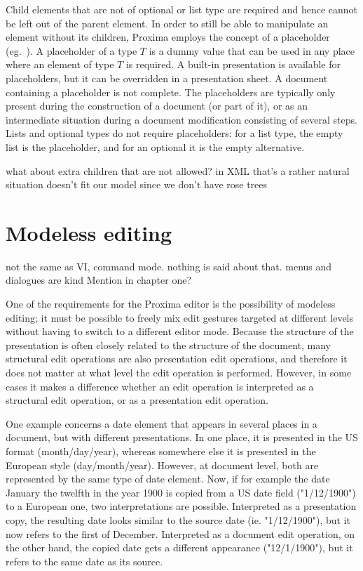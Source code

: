Child elements that are not of optional or list type are required and hence cannot be left out of the parent element. In order to still be able to manipulate an element without its children, Proxima employs the concept of a placeholder (eg.~\cite{syngen}). A placeholder of a type $T$ is a dummy value that can be used in any place where an element of type $T$ is required. A built-in presentation is available for placeholders, but it can be overridden in a presentation sheet. A document containing a placeholder is not complete. The placeholders are typically only present during the construction of a document (or part of it), or as an intermediate situation during a document modification consisting of several steps. Lists and optional types do not require placeholders: for a list type, the empty list is the placeholder, and for an optional it is the empty alternative.

\bc
what about extra children that are not allowed? in XML that's a rather natural situation doesn't fit our model since we don't have rose trees
\ec

%																
%																
%																
\section{Modeless editing}

\bc
not the same as VI, command mode. nothing is said about that. menus and dialogues are kind %
Mention in chapter one?
\ec

One of the requirements for the Proxima editor is the possibility of modeless editing; it must be possible to freely mix edit gestures targeted at different levels without having to switch to a different editor mode. Because the structure of the presentation is often closely related to the structure of the document, many structural edit operations are also presentation edit operations, and therefore it does not matter at what level the edit operation is performed. However, in some cases it makes a difference whether an edit operation is interpreted as a structural edit operation, or as a presentation edit operation.


One example concerns a date element that appears in several places in a document, but with different presentations. In one place, it is presented in the US format (month/day/year), whereas somewhere else it is presented in the European style (day/month/year). However, at document level, both are represented by the same type of date element. Now, if for example the date January the twelfth in the year 1900 is copied from a US date field ("1/12/1900") to a European one, two interpretations are possible. Interpreted as a presentation copy, the resulting date looks similar to the source date (ie. "1/12/1900"), but it now refers to the first of December. Interpreted as a document edit operation, on the other hand, the copied date gets a different appearance ("12/1/1900"), but it refers to the same date as its source.

